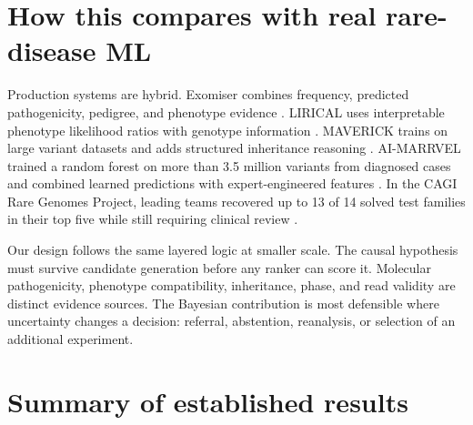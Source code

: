 \documentclass[11pt]{article}
\begin{document}
\section{How this compares with real rare-disease ML}

Production systems are hybrid. Exomiser combines frequency, predicted pathogenicity, pedigree, and phenotype evidence \citep{exomiser2015}. LIRICAL uses interpretable phenotype likelihood ratios with genotype information \citep{lirical2020}. MAVERICK trains on large variant datasets and adds structured inheritance reasoning \citep{maverick2023}. AI-MARRVEL trained a random forest on more than 3.5 million variants from diagnosed cases and combined learned predictions with expert-engineered features \citep{aimarrvel2024}. In the CAGI Rare Genomes Project, leading teams recovered up to 13 of 14 solved test families in their top five while still requiring clinical review \citep{stenton2024}.

Our design follows the same layered logic at smaller scale. The causal hypothesis must survive candidate generation before any ranker can score it. Molecular pathogenicity, phenotype compatibility, inheritance, phase, and read validity are distinct evidence sources. The Bayesian contribution is most defensible where uncertainty changes a decision: referral, abstention, reanalysis, or selection of an additional experiment.
\section{Summary of established results}
\end{document}
